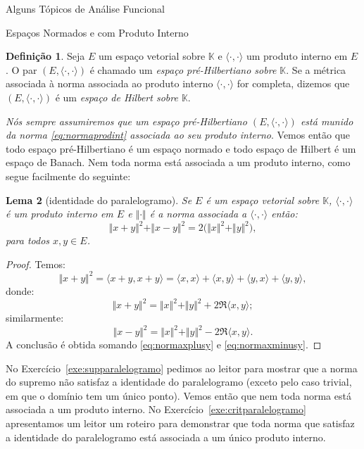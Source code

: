 \documentclass[oneside,final,11pt]{amsbook}
\newcommand{\K}{\mathds K}
\theoremstyle{remark}\newtheorem{exercise}{Exercício}[chapter]
\theoremstyle{remark}\newtheorem{*exercise}[exercise]{\hbox to 0pt{\hskip 0pt minus 1fil*}Exercício}
\theoremstyle{definition}\newtheorem{exdefin}{Definição}[chapter]
\theoremstyle{plain}\newtheorem{teo}{Teorema}[section]
\theoremstyle{plain}\newtheorem{lem}[teo]{Lema}
\theoremstyle{plain}\newtheorem{prop}[teo]{Proposição}
\theoremstyle{plain}\newtheorem{cor}[teo]{Corolário}
\theoremstyle{definition}\newtheorem{defin}[teo]{Definição}
\theoremstyle{remark}\newtheorem{rem}[teo]{Observação}
\theoremstyle{definition}\newtheorem{notation}[teo]{Notação}
\theoremstyle{definition}\newtheorem{convention}[teo]{Convenção}
\theoremstyle{definition}\newtheorem{example}[teo]{Exemplo}
\numberwithin{section}{chapter}
\numberwithin{equation}{section}
\begin{document}
\begin{chapter}{Alguns Tópicos de Análise Funcional}
\begin{section}{Espaços Normados e com Produto Interno}
\begin{defin}
Seja $E$ um espaço vetorial sobre $\K$ e $\langle\cdot,\cdot\rangle$ um produto interno em $E$. O par
$(E,\langle\cdot,\cdot\rangle)$ é chamado um {\em espaço pré-Hilbertiano sobre $\K$}.
Se a métrica associada à norma associada ao produto interno $\langle\cdot,\cdot\rangle$ for completa, dizemos
que $(E,\langle\cdot,\cdot\rangle)$ é um {\em espaço de Hilbert sobre $\K$}.
\end{defin}
{\em Nós sempre assumiremos que um espaço pré-Hilbertiano $(E,\langle\cdot,\cdot\rangle)$ está munido da norma
\eqref{eq:normaprodint} associada ao seu produto interno}. Vemos então que todo espaço pré-Hilbertiano é um espaço normado
e todo espaço de Hilbert é um espaço de Banach. Nem toda norma está associada a um produto interno, como segue facilmente
do seguinte:
\begin{lem}[identidade do paralelogramo]
Se $E$ é um espaço vetorial sobre $\K$, $\langle\cdot,\cdot\rangle$ é um produto interno em $E$ e $\Vert\cdot\Vert$
é a norma associada a $\langle\cdot,\cdot\rangle$ então:
\begin{equation}\label{eq:paralelogramo}
\Vert x+y\Vert^2+\Vert x-y\Vert^2=2\big(\Vert x\Vert^2+\Vert y\Vert^2\big),
\end{equation}
para todos $x,y\in E$.
\end{lem}
\begin{proof}
Temos:
\[\Vert x+y\Vert^2=\langle x+y,x+y\rangle=\langle x,x\rangle+\langle x,y\rangle+\langle y,x\rangle+\langle y,y\rangle,\]
donde:
\begin{equation}\label{eq:normaxplusy}
\Vert x+y\Vert^2=\Vert x\Vert^2+\Vert y\Vert^2+2\Re\langle x,y\rangle;
\end{equation}
similarmente:
\begin{equation}\label{eq:normaxminusy}
\Vert x-y\Vert^2=\Vert x\Vert^2+\Vert y\Vert^2-2\Re\langle x,y\rangle.
\end{equation}
A conclusão é obtida somando \eqref{eq:normaxplusy} e \eqref{eq:normaxminusy}.
\end{proof}
No Exercício~\ref{exe:supparalelogramo} pedimos ao leitor para mostrar que a norma do supremo não satisfaz a identidade do paralelogramo
(exceto pelo caso trivial, em que o domínio tem um único ponto). Vemos então que nem toda norma está associada a um produto
interno. No Exercício~\ref{exe:critparalelogramo} apresentamos um leitor um roteiro para demonstrar que toda norma
que satisfaz a identidade do paralelogramo está associada a um único produto interno.


\end{section}
\end{chapter}
\end{document}

